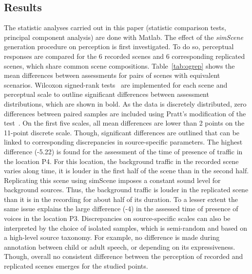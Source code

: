 \documentclass[twocolumn]{article}
\begin{document}
\subsection{Results}
\label{sec:exp_res}

The statistic analyses carried out in this paper (statistic comparison tests, principal component analysis) are done with Matlab. The effect of the \textit{simScene} generation procedure on perception is first investigated. To do so, perceptual responses are compared for the 6 recorded scenes and 6 corresponding replicated scenes, which share common scene compositions. Table~\ref{tab:ogrep} shows the mean differences between assessments for pairs of scenes with equivalent scenarios. Wilcoxon signed-rank tests~\cite{wilcoxon1945} are implemented for each scene and perceptual scale to outline significant differences between assessment distributions, which are shown in bold. As the data is discretely distributed, zero differences between paired samples are included using Pratt's modification of the test~\cite{pratt1959}. On the first five scales, all mean differences are lower than 2 points on the 11-point discrete scale. Though, significant differences are outlined that can be linked to corresponding discrepancies in source-specific parameters. The highest difference (-5.22) is found for the assessment of the time of presence of traffic in the location P4. For this location, the background traffic in the recorded scene varies along time, it is louder in the first half of the scene than in the second half. Replicating this scene using simScene imposes a constant sound level for background sources. Thus, the background traffic is louder in the replicated scene than it is in the recording for about half of its duration. To a lesser extent the same issue explains the large difference (-4) in the assessed time of presence of voices in the location P3. Discrepancies on source-specific scales can also be interpreted by the choice of isolated samples, which is semi-random and based on a high-level source taxonomy. For example, no difference is made during annotation between child or adult speech, or depending on its expressiveness. Though, overall no consistent difference between the perception of recorded and replicated scenes emerges for the studied points.
\end{document}

